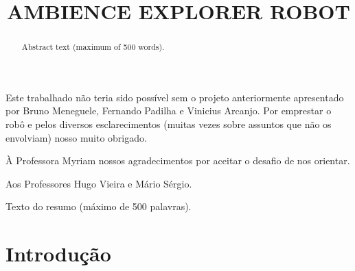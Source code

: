 \documentclass[oneside]{normas-utf-tex} %
\title{\MakeUppercase{Ambience Explorer Robot}} %
\begin{document}
\capa %
\folhaderosto %


\begin{agradecimentos}
Este trabalhado não teria sido possível sem o projeto anteriormente apresentado por Bruno Meneguele, Fernando Padilha e Vinicius Arcanjo.
Por emprestar o robô e pelos diversos esclarecimentos (muitas vezes sobre assuntos que não os envolviam) nosso muito obrigado.

À Professora Myriam nossos agradecimentos por aceitar o desafio de nos orientar. 

Aos Professores Hugo Vieira e Mário Sérgio.
 
\end{agradecimentos}


\begin{resumo}
Texto do resumo (m\'aximo de 500 palavras).
\end{resumo}

\begin{abstract}
Abstract text (maximum of 500 words).
\end{abstract}

\listadefiguras %
\listadetabelas %
\listadesiglas %
\listadesimbolos %

\sumario %


%
%
%
%


\chapter{Introdu\c{c}\~ao}
\end{document}
